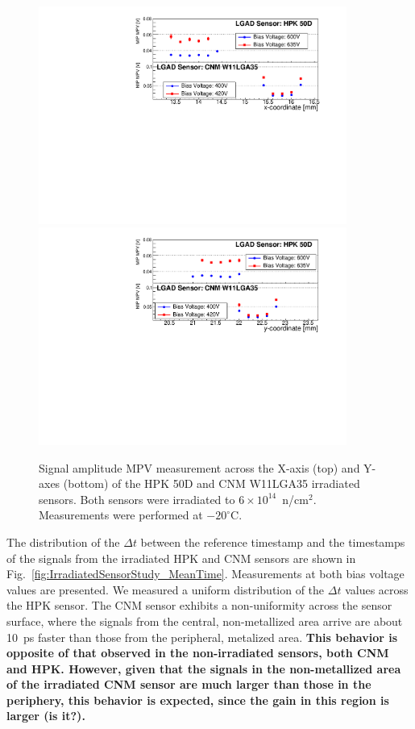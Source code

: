 \documentclass[preprint,1p]{elsarticle}
\begin{document}
\begin{figure}[htbp] 
\centering
\includegraphics[width=0.90\textwidth]{figs/USCSBoard_HPK50DIrradiated-CNMW11LGA35_Run936-961/IrradiatedSensorStudy_MPV_vs_X.pdf} 
\includegraphics[width=0.90\textwidth]{figs/USCSBoard_HPK50DIrradiated-CNMW11LGA35_Run936-961/IrradiatedSensorStudy_MPV_vs_Y.pdf} 
\caption{Signal amplitude MPV measurement across the X-axis (top) and Y-axes (bottom) of the HPK 50D and CNM W11LGA35 irradiated sensors. Both sensors were irradiated to $6\times 10^{14}$~n/cm$^2$. Measurements were performed at $-20^{\circ}$C.} 
\label{fig:IrradiatedSensorStudy_MPV} 
\end{figure}

The distribution of the $\Delta{t}$ between the reference timestamp and the
timestamps of the signals from the irradiated HPK and CNM sensors are shown in
Fig.~\ref{fig:IrradiatedSensorStudy_MeanTime}. Measurements at both bias voltage
values are presented. We measured a uniform distribution of the $\Delta{t}$
values across the HPK sensor. The CNM sensor exhibits a non-uniformity across
the sensor surface, where the signals from the central, non-metallized area
arrive are about 10~ps faster than those from the peripheral, metalized area.
\textbf {This behavior is opposite of that observed in the non-irradiated
sensors, both CNM and HPK. However, given that the signals in the non-metallized
area of the irradiated CNM sensor are much larger than those in the periphery,
this behavior is expected, since the gain in this region is larger (is it?).}
\end{document}
